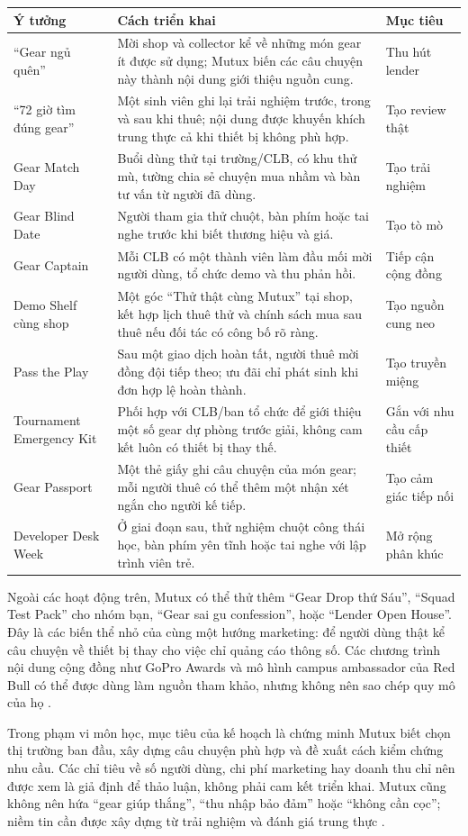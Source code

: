 \begin{longtable}{@{}p{}p{}p{}@{}}
\toprule
\textbf{Ý tưởng} & \textbf{Cách triển khai} & \textbf{Mục tiêu} \\
\midrule
\endhead
``Gear ngủ quên'' & Mời shop và collector kể về những món gear ít được sử dụng; Mutux biến các câu chuyện này thành nội dung giới thiệu nguồn cung. & Thu hút lender \\
``72 giờ tìm đúng gear'' & Một sinh viên ghi lại trải nghiệm trước, trong và sau khi thuê; nội dung được khuyến khích trung thực cả khi thiết bị không phù hợp. & Tạo review thật \\
Gear Match Day & Buổi dùng thử tại trường/CLB, có khu thử mù, tường chia sẻ chuyện mua nhầm và bàn tư vấn từ người đã dùng. & Tạo trải nghiệm \\
Gear Blind Date & Người tham gia thử chuột, bàn phím hoặc tai nghe trước khi biết thương hiệu và giá. & Tạo tò mò \\
Gear Captain & Mỗi CLB có một thành viên làm đầu mối mời người dùng, tổ chức demo và thu phản hồi. & Tiếp cận cộng đồng \\
Demo Shelf cùng shop & Một góc ``Thử thật cùng Mutux'' tại shop, kết hợp lịch thuê thử và chính sách mua sau thuê nếu đối tác có công bố rõ ràng. & Tạo nguồn cung neo \\
Pass the Play & Sau một giao dịch hoàn tất, người thuê mời đồng đội tiếp theo; ưu đãi chỉ phát sinh khi đơn hợp lệ hoàn thành. & Tạo truyền miệng \\
Tournament Emergency Kit & Phối hợp với CLB/ban tổ chức để giới thiệu một số gear dự phòng trước giải, không cam kết luôn có thiết bị thay thế. & Gắn với nhu cầu cấp thiết \\
Gear Passport & Một thẻ giấy ghi câu chuyện của món gear; mỗi người thuê có thể thêm một nhận xét ngắn cho người kế tiếp. & Tạo cảm giác tiếp nối \\
Developer Desk Week & Ở giai đoạn sau, thử nghiệm chuột công thái học, bàn phím yên tĩnh hoặc tai nghe với lập trình viên trẻ. & Mở rộng phân khúc \\
\bottomrule
\end{longtable}

Ngoài các hoạt động trên, Mutux có thể thử thêm ``Gear Drop thứ Sáu'', ``Squad Test Pack'' cho nhóm bạn, ``Gear sai gu confession'', hoặc ``Lender Open House''. Đây là các biến thể nhỏ của cùng một hướng marketing: để người dùng thật kể câu chuyện về thiết bị thay cho việc chỉ quảng cáo thông số. Các chương trình nội dung cộng đồng như GoPro Awards và mô hình campus ambassador của Red Bull có thể được dùng làm nguồn tham khảo, nhưng không nên sao chép quy mô của họ \cite{goproAwards2015,redbullStudentMarketeer}.

Trong phạm vi môn học, mục tiêu của kế hoạch là chứng minh Mutux biết chọn thị trường ban đầu, xây dựng câu chuyện phù hợp và đề xuất cách kiểm chứng nhu cầu. Các chỉ tiêu về số người dùng, chi phí marketing hay doanh thu chỉ nên được xem là giả định để thảo luận, không phải cam kết triển khai. Mutux cũng không nên hứa ``gear giúp thắng'', ``thu nhập bảo đảm'' hoặc ``không cần cọc''; niềm tin cần được xây dựng từ trải nghiệm và đánh giá trung thực \cite{godesMayzlin2009,ryuFeick2007referral}.

